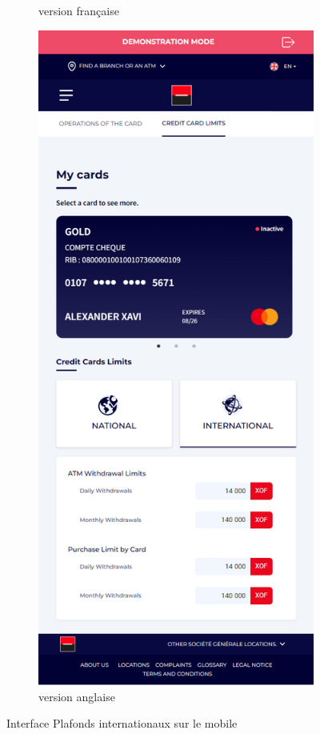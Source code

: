 \begin{figure}[!ht]
\begin{subfigure}[b]{0.49\textwidth}
        \caption{version française}
    \end{subfigure}
    \hfill
    \begin{subfigure}[b]{0.49\textwidth}
        \centering
        \includegraphics[width=\textwidth]{images/screens/limitsInter/mob.png}
        \caption{version anglaise}
    \end{subfigure}
       \caption{Interface Plafonds internationaux sur le mobile}
\end{figure}

